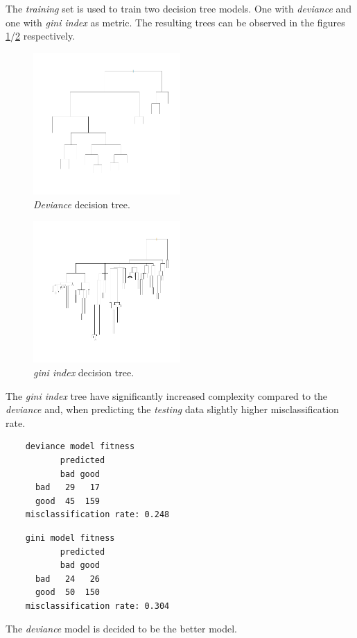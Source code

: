 \documentclass[a4paper, twocolumn]{article}
\begin{document}
	The \textit{training} set is used to train two decision tree models. One with \textit{deviance} and one with \textit{gini index} as metric. The resulting trees can be observed in the figures \ref{fig:deviance tree}/\ref{fig:gini tree} respectively.
	\begin{figure}
	    \centering
		\includegraphics[width=0.5\textwidth]{share/deviance_tree.png}  
		\caption{\textit{Deviance} decision tree.\label{fig:deviance tree}}
	\end{figure}
	\begin{figure}
	    \centering
		\includegraphics[width=0.5\textwidth]{share/gini_tree.png}  
		\caption{\textit{gini index} decision tree.\label{fig:gini tree}}
    \end{figure}
    The \textit{gini index} tree have significantly increased complexity compared to the \textit{deviance} and, when predicting the \textit{testing} data slightly higher misclassification rate.
	\begin{verbatim}
	deviance model fitness
	       predicted
	       bad good
	  bad   29   17
	  good  45  159
	misclassification rate: 0.248
	\end{verbatim}
	\begin{verbatim}
	gini model fitness
	       predicted
	       bad good
	  bad   24   26
	  good  50  150
	misclassification rate: 0.304
	\end{verbatim}
	The \textit{deviance} model is decided to be the better model.
\end{document}

